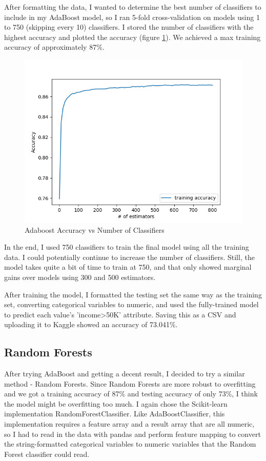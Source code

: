 \documentclass{article}
\begin{document}
After formatting the data, I wanted to determine the best number of classifiers to include in my AdaBoost model, so I ran 5-fold cross-validation on models using 1 to 750 (skipping every 10) classifiers. I stored the number of classifiers with the highest accuracy and plotted the accuracy (figure \ref{fig:adaboost}). We achieved a max training accuracy of approximately 87\%.

\begin{figure}[h]
    \centering
    \includegraphics[width=0.6\linewidth]{img/ab_acc.png}
    \caption{Adaboost Accuracy vs Number of Classifiers}
    \label{fig:adaboost}
\end{figure}

In the end, I used 750 classifiers to train the final model using all the training data. I could potentially continue to increase the number of classifiers. Still, the model takes quite a bit of time to train at 750, and that only showed marginal gains over models using 300 and 500 estimators.

After training the model, I formatted the testing set the same way as the training set, converting categorical variables to numeric, and used the fully-trained model to predict each value's 'income>50K' attribute. Saving this as a CSV and uploading it to Kaggle showed an accuracy of 73.041\%. 

\subsection{Random Forests}

After trying AdaBoost and getting a decent result, I decided to try a similar method - Random Forests. Since Random Forests are more robust to overfitting and we got a training accuracy of 87\% and testing accuracy of only 73\%, I think the model might be overfitting too much. I again chose the Scikit-learn implementation RandomForestClassifier. Like AdaBoostClassifier, this implementation requires a feature array and a result array that are all numeric, so I had to read in the data with pandas and perform feature mapping to convert the string-formatted categorical variables to numeric variables that the Random Forest classifier could read. 
\end{document}
